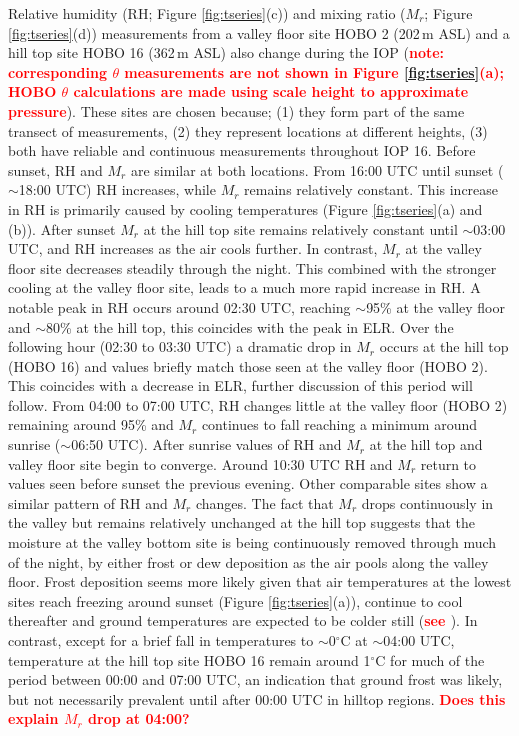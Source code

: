 \documentclass[times]{qjrms4}
\begin{document}
Relative humidity (RH; Figure \ref{fig:tseries}(c)) and mixing ratio ($M_r$; Figure \ref{fig:tseries}(d)) measurements from a valley floor site HOBO 2 (202$\,\mbox{m}$ ASL) and a hill top site HOBO 16 (362$\,\mbox{m}$ ASL) also change during the IOP (\textcolor{red}{\bf note: corresponding $\theta$ measurements are not shown in Figure \ref{fig:tseries}(a); HOBO $\theta$ calculations are made using scale height to approximate pressure}). These sites are chosen because; (1) they form part of the same transect of measurements, (2) they represent locations at different heights, (3) both have reliable and continuous measurements throughout IOP 16. Before sunset, RH and $M_r$ are similar at both locations. From 16:00 UTC until sunset ($\sim$18:00 UTC) RH increases, while $M_r$ remains relatively constant. This increase in RH is primarily caused by cooling temperatures (Figure \ref{fig:tseries}(a) and (b)). After sunset $M_r$ at the hill top site remains relatively constant until $\sim$03:00 UTC, and RH increases as the air cools further. In contrast, $M_r$ at the valley floor site decreases steadily through the night. This combined with the stronger cooling at the valley floor site, leads to a much more rapid increase in RH. A notable peak in RH occurs around 02:30 UTC, reaching $\sim$95\% at the valley floor and $\sim$80\% at the hill top, this coincides with the peak in ELR. Over the following hour (02:30 to 03:30 UTC) a dramatic drop in $M_r$ occurs at the hill top (HOBO 16) and values briefly match those seen at the valley floor (HOBO 2). This coincides with a decrease in ELR, further discussion of this period will follow. From 04:00 to 07:00 UTC, RH changes little at the valley floor (HOBO 2) remaining around 95\% and $M_r$ continues to fall reaching a minimum around sunrise ($\sim$06:50 UTC). After sunrise values of RH and $M_r$ at the hill top and valley floor site begin to converge. Around 10:30 UTC RH and $M_r$ return to values seen before sunset the previous evening. Other comparable sites show a similar pattern of RH and $M_r$ changes. The fact that $M_r$ drops continuously in the valley but remains relatively unchanged at the hill top suggests that the moisture at the valley bottom site is being continuously removed through much of the night, by either frost or dew deposition as the air pools along the valley floor. Frost deposition seems more likely given that air temperatures at the lowest sites reach freezing around sunset (Figure \ref{fig:tseries}(a)), continue to cool thereafter and ground temperatures are expected to be colder still (\textcolor{red}{\bf see \citet{Vosper2013narrow}}). In contrast, except for a brief fall in temperatures to $\sim$0$^{\circ}$C at $\sim$04:00 UTC, temperature at the hill top site HOBO 16 remain around 1$^\circ$C for much of the period between 00:00 and 07:00 UTC, an indication that ground frost was likely, but not necessarily prevalent until after 00:00 UTC in hilltop regions. \textcolor{red}{\bf Does this explain $M_r$ drop at 04:00?} 
\end{document}
